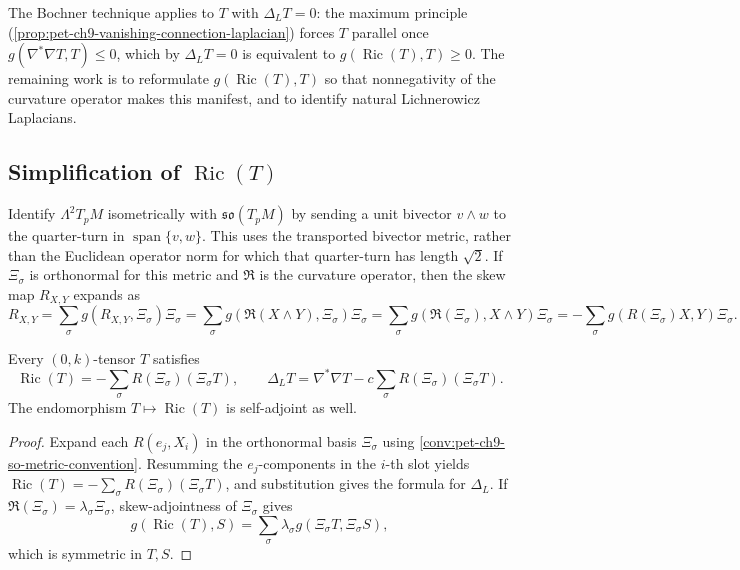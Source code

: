 The Bochner technique applies to $T$ with $\Delta_LT=0$: the maximum principle
(\cref{prop:pet-ch9-vanishing-connection-laplacian}) forces $T$ parallel once
$g(\nabla^*\nabla T,T)\le0$, which by $\Delta_LT=0$ is equivalent to
$g(\operatorname{Ric}(T),T)\ge0$. The remaining work is to reformulate
$g(\operatorname{Ric}(T),T)$ so that nonnegativity of the curvature operator makes this
manifest, and to identify natural Lichnerowicz Laplacians.

\subsection{Simplification of $\operatorname{Ric}(T)$}

\begin{convention}
  \label{conv:pet-ch9-so-metric-convention}
  Identify $\Lambda^2T_pM$ isometrically with $\mathfrak{so}(T_pM)$ by sending
  a unit bivector $v\wedge w$ to the quarter-turn in
  $\operatorname{span}\{v,w\}$.  This uses the transported bivector metric,
  rather than the Euclidean operator norm for which that quarter-turn has
  length $\sqrt2$.  If $\Xi_\sigma$ is orthonormal for this metric and
  $\mathfrak R$ is the curvature operator, then the skew map
  $R_{X,Y}$ expands as
  \[
    R_{X,Y}=\sum_\sigma g(R_{X,Y},\Xi_\sigma)\Xi_\sigma
    =\sum_\sigma g(\mathfrak{R}(X\wedge Y),\Xi_\sigma)\Xi_\sigma
    =\sum_\sigma g(\mathfrak{R}(\Xi_\sigma),X\wedge Y)\Xi_\sigma
    =-\sum_\sigma g(R(\Xi_\sigma)X,Y)\Xi_\sigma.
  \]
\end{convention}

\begin{lemma}
  \label{lem:pet-ch9-ric-curvature-operator-formula}
  Every $(0,k)$-tensor $T$ satisfies
  \[
    \operatorname{Ric}(T)=-\sum_\sigma R(\Xi_\sigma)(\Xi_\sigma T),\qquad
    \Delta_LT=\nabla^*\nabla T-c\sum_\sigma R(\Xi_\sigma)(\Xi_\sigma T).
  \]
  The endomorphism $T\mapsto\operatorname{Ric}(T)$ is self-adjoint as well.
\end{lemma}
\begin{proof}
  \sketch
  Expand each \(R(e_j,X_i)\) in the orthonormal basis
  \(\Xi_\sigma\) using \cref{conv:pet-ch9-so-metric-convention}.  Resumming
  the \(e_j\)-components in the \(i\)-th slot yields
  \(\operatorname{Ric}(T)=-\sum_\sigma R(\Xi_\sigma)(\Xi_\sigma T)\), and
  substitution gives the formula for \(\Delta_L\).  If
  \(\mathfrak R(\Xi_\sigma)=\lambda_\sigma\Xi_\sigma\), skew-adjointness of
  \(\Xi_\sigma\) gives
  \[
    g(\operatorname{Ric}(T),S)
      =\sum_\sigma\lambda_\sigma g(\Xi_\sigma T,\Xi_\sigma S),
  \]
  which is symmetric in \(T,S\).
\end{proof}

